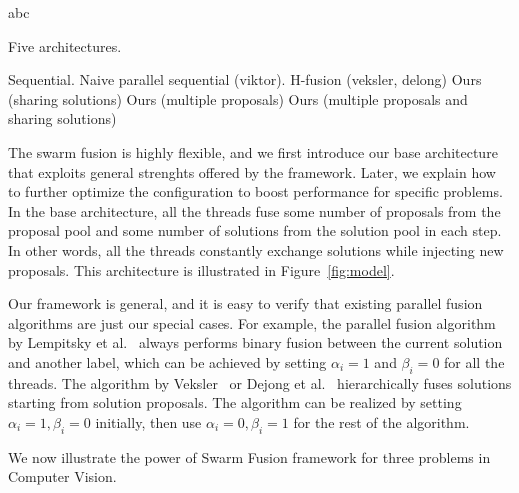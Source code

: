 %




\noindent
abc







Five architectures.

Sequential.
Naive parallel sequential (viktor).
H-fusion (veksler, delong)
Ours (sharing solutions)
Ours (multiple proposals)
Ours (multiple proposals and sharing solutions)





The swarm fusion is highly flexible, and we first introduce our base
architecture that exploits general strenghts offered by the
framework. Later, we explain how to further optimize the configuration
to boost performance for specific problems. In the base architecture,
all the threads fuse some number of proposals from the proposal pool and
some number of solutions from the solution pool in each step. In other
words, all the threads constantly exchange solutions while injecting new
proposals. This architecture is illustrated in Figure~\ref{fig:model}.



 Our framework is
general, and it is easy to verify that existing parallel fusion
algorithms are just our special cases.
%
For example, the parallel fusion algorithm by Lempitsky et
al.~\cite{viktor} always performs binary fusion between the current
solution and another label, which can be achieved by setting $\alpha_i =
1$ and $\beta_i = 0$ for all the threads. The algorithm by
Veksler~\cite{olga} or Dejong et al.~\cite{dejong} hierarchically fuses
solutions starting from solution proposals. The algorithm can be
realized by setting $\alpha_i = 1, \beta_i = 0$ initially, then use
$\alpha_i = 0, \beta_i=1$  for the rest of the algorithm.

\noindent
We now illustrate the power of Swarm Fusion framework for three problems
in Computer Vision. 






